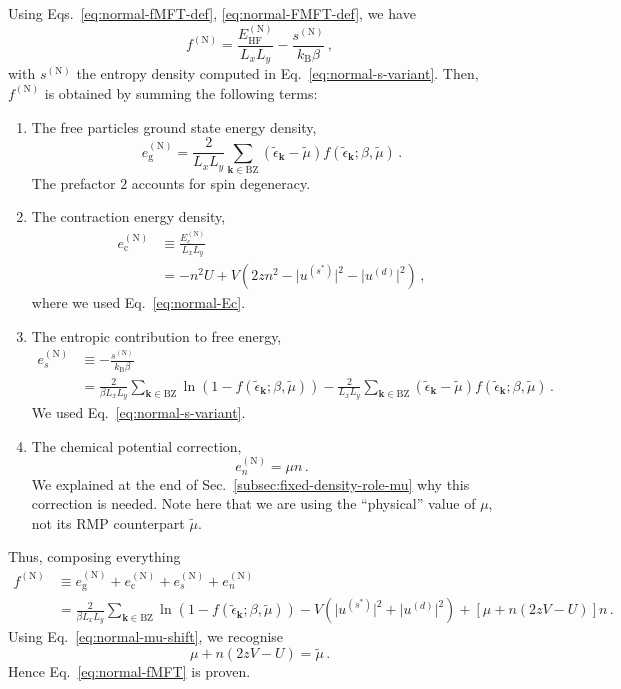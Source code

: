 \begin{tabproof}
	
	Using Eqs.~\eqref{eq:normal-fMFT-def}, \eqref{eq:normal-FMFT-def}, we have
	\[
		f^{(\mathrm{N})} = \frac{E_\mathrm{HF}^{(\mathrm{N})}}{L_x L_y} - \frac{s^{(\mathrm{N})}}{k_\mathrm{B} \beta} \, ,
	\]
	with $s^{(\mathrm{N})}$ the entropy density computed in Eq.~\eqref{eq:normal-s-variant}. Then, $f^{(\mathrm{N})}$ is obtained by summing the following terms:
	\begin{enumerate}
		\item The free particles ground state energy density,
		\[
			e_\mathrm{g}^{(\mathrm{N})} = \frac{2}{L_x L_y} \sum_{\mathbf{k}\in\mathrm{BZ}} (\tilde{\epsilon}_\mathbf{k}-\tilde{\mu}) f( \tilde{\epsilon}_\mathbf{k}; \beta,\tilde{\mu} ) \, .
		\]
		The prefactor $2$ accounts for spin degeneracy.
		\item The contraction energy density,
		\[
		\begin{aligned}
			e_\mathrm{c}^{(\mathrm{N})} &\equiv \frac{E_\mathrm{c}^{(\mathrm{N})}}{L_x L_y} \\
			&= - n^2 U + V \left(
				2zn^2 - 
				\big|
					u^{(s^*)}
				\big|^2 - \big|
					u^{(d)}
				\big|^2
			\right) \, ,
		\end{aligned}
		\]
		where we used Eq.~\eqref{eq:normal-Ec}.
		\item The entropic contribution to free energy,
		\[
		\begin{aligned}
			e_s^{(\mathrm{N})} &\equiv -\frac{s^{(\mathrm{N})}}{k_\mathrm{B} \beta} \\
			&= \frac{2}{\beta L_x L_y} \sum_{\mathbf{k}\in\mathrm{BZ}} \ln \left(
			1- f( \tilde{\epsilon}_\mathbf{k}; \beta,\tilde{\mu}) \right) - \frac{2}{L_x L_y} \sum_{\mathbf{k}\in\mathrm{BZ}} (\tilde{\epsilon}_\mathbf{k}-\tilde{\mu}) f( \tilde{\epsilon}_\mathbf{k}; \beta,\tilde{\mu}) \, .
		\end{aligned}
		\]
		We used Eq.~\eqref{eq:normal-s-variant}.
		\item The chemical potential correction,
		\[
			e_n^{(\mathrm{N})} = \mu n \, .
		\]
		We explained at the end of Sec.~\ref{subsec:fixed-density-role-mu} why this correction is needed. 	Note here that we are using the ``physical'' value of $\mu$, not its RMP counterpart $\tilde{\mu}$.
	\end{enumerate}
	Thus, composing everything
	\[
	\begin{aligned}
		f^{(\mathrm{N})} &\equiv e_\mathrm{g}^{(\mathrm{N})} + e_\mathrm{c}^{(\mathrm{N})} + e_s^{(\mathrm{N})} + e_n^{(\mathrm{N})} \nonumber \\
		&= \frac{2}{\beta L_x L_y} \sum_{\mathbf{k}\in\mathrm{BZ}} \ln \left(
		1- f( \tilde{\epsilon}_\mathbf{k}; \beta,\tilde{\mu}) \right) - V \left( 
			\big|
				u^{(s^*)}
			\big|^2 + \big|
				u^{(d)}
			\big|^2
		\right) + \left[
			\mu + n(2zV-U)
		\right] n \, .
	\end{aligned}
	\]
	Using Eq.~\eqref{eq:normal-mu-shift}, we recognise
	\[
		\mu + n(2zV-U) = \tilde{\mu} \, .
	\]
	Hence Eq.~\eqref{eq:normal-fMFT} is proven.
\end{tabproof}

